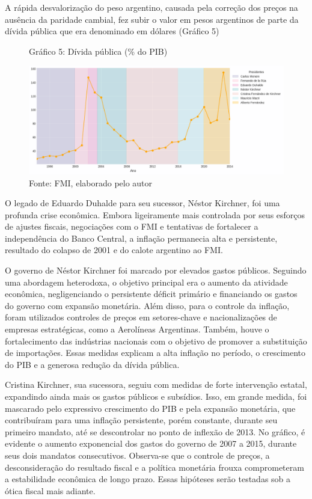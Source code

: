 \documentclass[a4paper, 12pt, openany, oneside, brazil]{abntex2}
\begin{document}
A rápida desvalorização do peso argentino, causada pela correção dos preços na ausência da paridade cambial, fez subir o valor em pesos argentinos de parte da dívida pública que era denominado em dólares (Gráfico 5)

\begin{figure}[!ht]
	\caption*{Gráfico 5: Dívida pública (\% do PIB)}
	\includegraphics[width=\textwidth]{dados/divida_publica}
	\caption*{Fonte: FMI, elaborado pelo autor}
\end{figure}

O legado de Eduardo Duhalde para seu sucessor, Néstor Kirchner, foi uma profunda crise econômica. Embora ligeiramente mais controlada por seus esforços de ajustes fiscais, negociações com o FMI e tentativas de fortalecer a independência do Banco Central, a inflação permanecia alta e persistente, resultado do colapso de 2001 e do calote argentino ao FMI.

O governo de Néstor Kirchner foi marcado por elevados gastos públicos. Seguindo uma abordagem heterodoxa, o objetivo principal era o aumento da atividade econômica, negligenciando o persistente déficit primário e financiando os gastos do governo com expansão monetária. Além disso, para o controle da inflação, foram utilizados controles de preços em setores-chave e nacionalizações de empresas estratégicas, como a Aerolíneas Argentinas. Também, houve o fortalecimento das indústrias nacionais com o objetivo de promover a substituição de importações. Essas medidas explicam a alta inflação no período, o crescimento do PIB e a generosa redução da dívida pública.


Cristina Kirchner, sua sucessora, seguiu com medidas de forte intervenção estatal, expandindo ainda mais os gastos públicos e subsídios. Isso, em grande medida, foi mascarado pelo expressivo crescimento do PIB e pela expansão monetária, que contribuíram para uma inflação persistente, porém constante, durante seu primeiro mandato, até se descontrolar no ponto de inflexão de 2013. No gráfico, é evidente o aumento exponencial dos gastos do governo de 2007 a 2015, durante seus dois mandatos consecutivos. Observa-se que o controle de preços, a desconsideração do resultado fiscal e a política monetária frouxa comprometeram a estabilidade econômica de longo prazo. Essas hipóteses serão testadas sob a ótica fiscal mais adiante.
\end{document}
